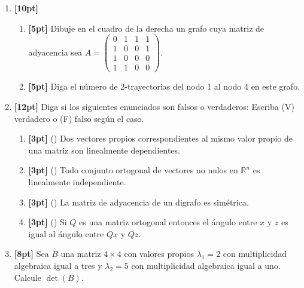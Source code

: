 \documentclass[11pt]{article}
\begin{document}
\begin{enumerate}
\item \textbf{[10pt]}
\begin{enumerate}[label=(\alph*)]
\item \textbf{[5pt]} Dibuje en el cuadro de la derecha un grafo cuya matriz de adyacencia sea $A=\begin{pmatrix}0&1&1&1\\1&0&0&1\\1&0&0&0\\1&1&0&0\end{pmatrix}$.

\begin{center}
\end{center}

\item \textbf{[5pt]} Diga el n\'umero de 2-trayectorias del nodo 1 al nodo 4 en este grafo. \dotfill
\end{enumerate}

\item \textbf{[12pt]} Diga si los siguientes enunciados son falsos o verdaderos: Escriba (V) verdadero o (F) falso seg\'un el caso.
\begin{enumerate}[label=(\alph*)]
\item \textbf{[3pt]} (\dotfill) Dos vectores propios correspondientes al mismo valor propio de una matriz son linealmente dependientes.
\item \textbf{[3pt]} (\dotfill) Todo conjunto ortogonal de vectores no nulos en $\mathbb{R}^n$ es linealmente independiente.
\item \textbf{[3pt]} (\dotfill) La matriz de adyacencia de un digrafo es sim\'etrica.
\item \textbf{[3pt]} (\dotfill) Si $Q$ es una matriz ortogonal entonces el \'angulo entre $x$ y $z$ es igual al \'angulo entre $Qx$ y $Qz$.
\end{enumerate}

\item \textbf{[8pt]} Sea $B$ una matriz $4\times 4$ con valores propios $\lambda_1=2$ con multiplicidad algebraica igual a tres y $\lambda_2=5$ con multiplicidad algebraica igual a uno. Calcule $\det(B)$.

\begin{center}
\end{center}
\end{enumerate}
\end{document}

